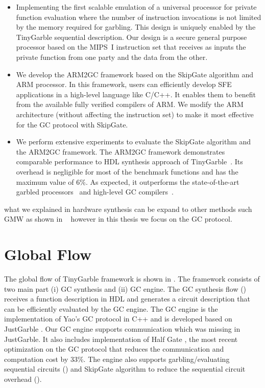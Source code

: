 \begin{itemize}
\item
  Implementing the first scalable emulation of a universal processor for private function evaluation where the number of instruction invocations is not limited by the memory required for garbling.
  This design is uniquely enabled by the TinyGarble sequential description.
  Our design is a secure general purpose processor based on the MIPS~I instruction set that receives as inputs the private function from one party and the data from the other.
\item We develop the ARM2GC framework based on the SkipGate algorithm and ARM processor.
    In this framework, users can efficiently develop SFE applications in a high-level language like C/C++.
    It enables them to benefit from the available fully verified compilers of ARM.
    We modify the ARM architecture (without affecting the instruction set) to make it most effective for the GC protocol with SkipGate.
\item We perform extensive experiments to evaluate the SkipGate algorithm and the ARM2GC framework.
    The ARM2GC framework demonstrates comparable performance to HDL synthesis approach of TinyGarble~\cite{songhori2015tinygarble}.
    Its overhead is negligible for most of the benchmark functions and has the maximum value of 6\%.
    As expected, it outperforms the state-of-the-art garbled processors~\cite{wang2015secure, songhori2016garbledcpu} and high-level GC compilers~\cite{holzer2012secure, mood2016frigate}.
\end{itemize}

what we explained in hardware synthesis can be expand to other methods such GMW as shown in ~\cite{} however in this thesis we focus on the GC protocol.

\section{Global Flow}
The global flow of TinyGarble framework is shown in .
The framework consists of two main part (i) GC synthesis and (ii) GC engine.
The GC synthesis flow () receives a function description in HDL and generates a circuit description that can be efficiently evaluated by the GC engine.
The GC engine is the implementation of Yao's GC protocol in C++ and is developed based on JustGarble \cite{bellare2013efficient}.
Our GC engine supports communication which was missing in JustGarble.
It also includes implementation of Half Gate \cite{zahur2015two}, the most recent optimization on the GC protocol that reduces the communication and computation cost by 33\%.
The engine also supports garbling/evaluating sequential circuits () and SkipGate algorithm to reduce the sequential circuit overhead ().

